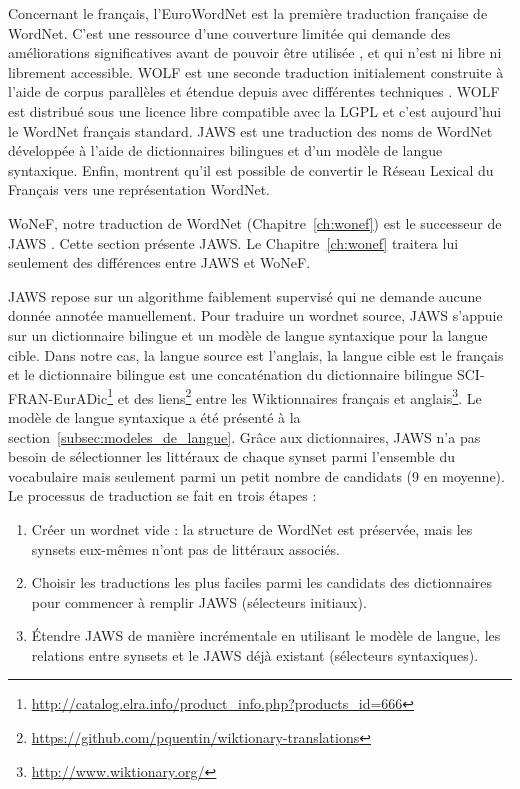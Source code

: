 Concernant le français, l'EuroWordNet \citep{vossen1998eurowordnet} est la
première traduction française de WordNet. C'est une ressource d'une couverture
limitée qui demande des améliorations significatives avant de pouvoir être
utilisée \citep{jacquin2006systemes}, et qui n'est ni libre ni librement
accessible. WOLF est une seconde traduction initialement construite à l'aide de
corpus parallèles \citep{sagot2008construction} et étendue depuis avec
différentes techniques \citep{apidianaki2012applying}. WOLF est distribué sous
une licence libre compatible avec la LGPL et c'est aujourd'hui le WordNet
français standard. JAWS \citep{mouton2010jaws} est une traduction des noms de
WordNet développée à l'aide de dictionnaires bilingues et d'un modèle de langue
syntaxique. Enfin, \cite{gader2014lexicon} montrent qu'il est possible de
convertir le Réseau Lexical du Français vers une représentation WordNet.


\label{subsec:jaws_translation_process}

WoNeF, notre traduction de WordNet (Chapitre~\ref{ch:wonef}) est le successeur
de JAWS \citep{mouton2010jaws,mouton2010phd}. Cette section présente JAWS. Le
Chapitre~\ref{ch:wonef} traitera lui seulement des différences entre JAWS et
WoNeF.

JAWS repose sur un algorithme faiblement supervisé qui ne demande aucune donnée
annotée manuellement. Pour traduire un wordnet source, JAWS s'appuie sur un
dictionnaire bilingue et un modèle de langue syntaxique pour la langue cible.
Dans notre cas, la langue source est l'anglais, la langue cible est le français
et le dictionnaire bilingue est une concaténation du dictionnaire bilingue
SCI-FRAN-EurADic\footnote{\url{http://catalog.elra.info/product_info.php?products_id=666}}
et des
liens\footnote{\url{https://github.com/pquentin/wiktionary-translations}} entre
les Wiktionnaires français et
anglais\footnote{\url{http://www.wiktionary.org/}}. Le modèle de langue
syntaxique a été présenté à la section~\ref{subsec:modeles_de_langue}. Grâce
aux dictionnaires, JAWS n'a pas besoin de sélectionner les littéraux de chaque
synset parmi l'ensemble du vocabulaire mais seulement parmi un petit nombre de
candidats (9 en moyenne).  Le processus de traduction se fait en trois étapes :

\begin{enumerate}
    \item Créer un wordnet vide : la structure de WordNet est préservée, mais
        les synsets eux-mêmes n'ont pas de littéraux associés.
    \item Choisir les traductions les plus faciles parmi les candidats des
        dictionnaires pour commencer à remplir JAWS (sélecteurs initiaux).
    \item Étendre JAWS de manière incrémentale en utilisant le modèle de
        langue, les relations entre synsets et le JAWS déjà existant
        (sélecteurs syntaxiques).
\end{enumerate}

